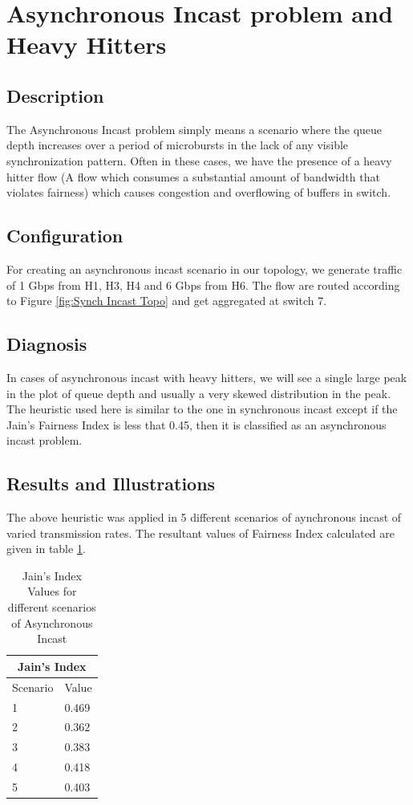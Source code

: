 \section{Asynchronous Incast problem and Heavy Hitters}
\subsection{Description}
The Asynchronous Incast problem simply means a scenario where the queue depth increases over a period of microbursts
in the lack of any visible synchronization pattern. Often in these cases, we have the presence of a heavy hitter flow\cite{HH}
(A flow which consumes a substantial amount of bandwidth that violates fairness) which causes congestion and overflowing
of buffers in switch.
\subsection{Configuration}
For creating an asynchronous incast scenario in our topology, we generate traffic of 1 Gbps from H1, H3, H4 and 6 Gbps from H6. The flow are routed
according to Figure \ref{fig:Synch Incast Topo} and get aggregated at switch 7.
\subsection{Diagnosis}
In cases of asynchronous incast with heavy hitters, we will see a single large peak in the plot of queue depth and usually a very
skewed distribution in the peak. The heuristic used here is similar to the one in synchronous incast except if the Jain's 
Fairness Index is less that 0.45, then it is classified as an asynchronous incast problem.
\subsection{Results and Illustrations}

The above heuristic was applied in 5 different scenarios of aynchronous incast of varied transmission rates.
The resultant values of Fairness Index calculated are given in table \ref{tab:J_Index_Async}.
\begin{table}[h]
	\begin{center}
	\begin{tabular}{ |p{3cm}|p{3cm}|  }
		\hline
		\multicolumn{2}{|c|}{Jain's Index} \\
		\hline
		Scenario & Value \\
		\hline
		1 & 0.469 \\
		2 & 0.362 \\
		3 & 0.383 \\
		4 & 0.418 \\
		5 & 0.403 \\
		\hline
	   \end{tabular}
	\end{center}
	
	\caption{Jain's Index Values for different scenarios of Asynchronous Incast}
	\label{tab:J_Index_Async}
	\end{table}


